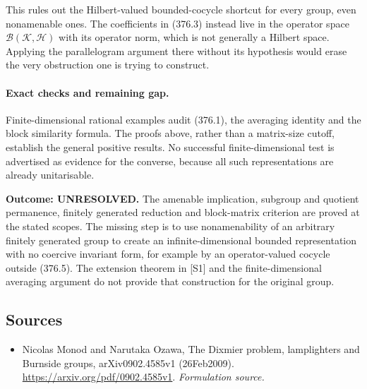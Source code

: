 \documentclass[11pt]{article}
\begin{document}
This rules out the Hilbert-valued bounded-cocycle shortcut for every
group, even nonamenable ones. The coefficients in (376.3) instead live
in the operator space $\mathcal B(\mathcal K,\mathcal H)$ with its
operator norm, which is not generally a Hilbert space. Applying the
parallelogram argument there without its hypothesis would erase the
very obstruction one is trying to construct.

\paragraph{Exact checks and remaining gap.}
Finite-dimensional rational examples audit (376.1), the averaging
identity and the block similarity formula. The proofs above, rather
than a matrix-size cutoff, establish the general positive results.
No successful finite-dimensional test is advertised as evidence for
the converse, because all such representations are already unitarisable.

\textbf{Outcome: UNRESOLVED.} The amenable implication, subgroup and
quotient permanence, finitely generated reduction and block-matrix
criterion are proved at the stated scopes. The missing step is to use
nonamenability of an arbitrary finitely generated group to create an
infinite-dimensional bounded representation with no coercive invariant
form, for example by an operator-valued cocycle outside (376.5).
The extension theorem in [S1] and the finite-dimensional averaging
argument do not provide that construction for the original group.

\subsection{Sources}
\begin{itemize}
\item[S1]Nicolas Monod and Narutaka Ozawa, The Dixmier problem, lamplighters and Burnside groups, arXiv0902.4585v1 (26Feb2009).
\url{https://arxiv.org/pdf/0902.4585v1}.
\textit{Formulation source.}
\end{itemize}
\end{document}
